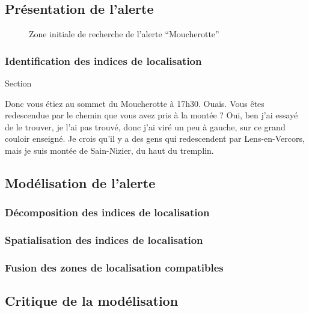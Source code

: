 
\subsection{Présentation de l'alerte}
\label{subsec:9-3-1}


\begin{figure}
  \centering
  
  \caption{Zone initiale de recherche de l'alerte
    \enquote{Moucherotte}}
  \label{fig:zir_moucherotte}
\end{figure}

\subsubsection{Identification des indices de localisation}
\label{subsec:9-3-1-1}

Section

\begin{dialogue}
  \Sec {} Donc vous étiez au sommet du Moucherotte à 17h30.
  \Req Ouais.
  \Sec {} Vous êtes redescendue par le chemin que
  vous avez pris à la montée ?
  \Req {} Oui, ben j’ai essayé de le trouver, je l’ai pas
  trouvé,  donc j’ai viré un peu à gauche,  sur ce
  grand couloir enseigné.  Je crois qu’il y a des gens
  qui redescendent par Lens-en-Vercors,  mais je suis
  montée de Sain-Nizier, du haut du tremplin.
\end{dialogue}
% 

\subsection{Modélisation de l'alerte}
\label{subsec:9-3-2}

\subsubsection{Décomposition des indices de localisation}
\label{subsec:9-3-2-2}

\subsubsection{Spatialisation des indices de localisation}
\label{subsec:9-3-2-3}

\subsubsection{Fusion des zones de localisation compatibles}
\label{subsec:9-3-2-4}

\subsection{Critique de la modélisation}
\label{subsec:9-3-3}


